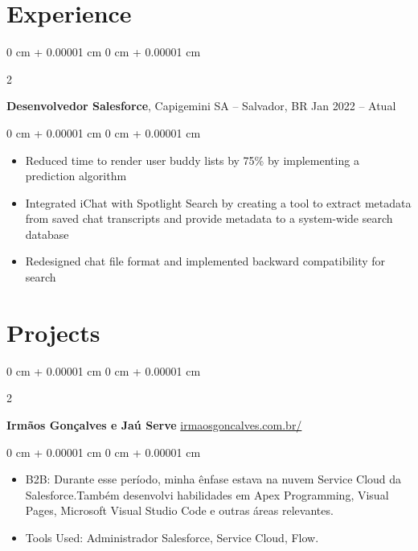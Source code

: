 \documentclass[10pt, letterpaper]{article}
\newenvironment{highlights}{
    \begin{itemize}[
        topsep=0.10 cm,
        parsep=0.10 cm,
        partopsep=0pt,
        itemsep=0pt,
        leftmargin=0 cm + 10pt
    ]
}{
    \end{itemize}
} %
\newenvironment{onecolentry}{
    \begin{adjustwidth}{
        0 cm + 0.00001 cm
    }{
        0 cm + 0.00001 cm
    }
}{
    \end{adjustwidth}
} %
\newenvironment{twocolentry}[2][]{
    \onecolentry
    \def\secondColumn{#2}
    \setcolumnwidth{\fill, 4.5 cm}
    \begin{paracol}{2}
}{
    \switchcolumn \raggedleft \secondColumn
    \end{paracol}
    \endonecolentry
} %
\begin{document}
        \vspace{0.10 cm}



    
    \section{Experience}



        
        \begin{twocolentry}{
            Jan 2022 – Atual
        }
            \textbf{Desenvolvedor Salesforce}, Capigemini SA -- Salvador, BR\end{twocolentry}

        \vspace{0.10 cm}
        \begin{onecolentry}
            \begin{highlights}
                \item Reduced time to render user buddy lists by 75\% by implementing a prediction algorithm
                \item Integrated iChat with Spotlight Search by creating a tool to extract metadata from saved chat transcripts and provide metadata to a system-wide search database
                \item Redesigned chat file format and implemented backward compatibility for search
            \end{highlights}
        \end{onecolentry}


    


    
    \section{Projects}



        
        \begin{twocolentry}{
            \href{https://www.irmaosgoncalves.com.br/}{irmaosgoncalves.com.br/}
        }
        
            \textbf{Irmãos Gonçalves e Jaú Serve}\end{twocolentry}

        \vspace{0.10 cm}
        \begin{onecolentry}
            \begin{highlights}
                \item B2B: Durante esse período, minha ênfase estava na nuvem Service Cloud da Salesforce.Também desenvolvi habilidades em Apex Programming, Visual Pages, Microsoft Visual Studio Code e outras áreas relevantes.
                \item Tools Used: Administrador Salesforce, Service Cloud, Flow. 
            \end{highlights}
        \end{onecolentry}
        
\end{document}
